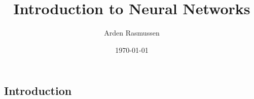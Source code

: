 \documentclass[10pt]{amsart}
\title{Introduction to Neural Networks}
\author{Arden Rasmussen}
\date{\today}
\begin{document}
\maketitle

\begin{multicols}{2}
  \section{Introduction}%
  \label{sec:introduction}


\end{multicols}
\end{document}
